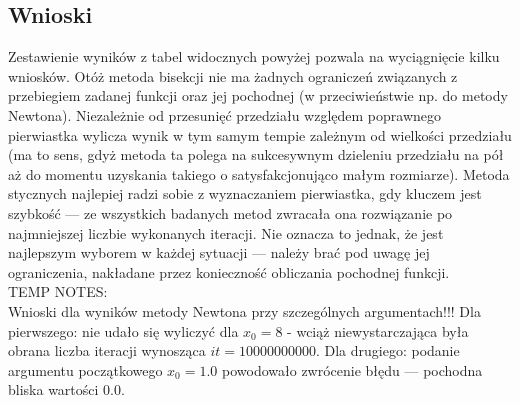 \documentclass{classrep}
\begin{document}
	\subsection{Wnioski}
		Zestawienie wyników z tabel widocznych powyżej pozwala na wyciągnięcie kilku wniosków. Otóż metoda bisekcji nie ma żadnych ograniczeń związanych z przebiegiem zadanej funkcji oraz jej pochodnej (w przeciwieństwie np. do metody Newtona). Niezależnie od przesunięć przedziału względem poprawnego pierwiastka wylicza wynik w tym samym tempie zależnym od wielkości przedziału (ma to sens, gdyż metoda ta polega na sukcesywnym dzieleniu przedziału na pół aż do momentu uzyskania takiego o satysfakcjonująco małym rozmiarze). Metoda stycznych najlepiej radzi sobie z wyznaczaniem pierwiastka, gdy kluczem jest szybkość --- ze wszystkich badanych metod zwracała ona rozwiązanie po najmniejszej liczbie wykonanych iteracji. Nie oznacza to jednak, że jest najlepszym wyborem w każdej sytuacji --- należy brać pod uwagę jej ograniczenia, nakładane przez konieczność obliczania pochodnej funkcji.  \\
	
		TEMP NOTES:	 \\
		Wnioski dla wyników metody Newtona przy szczególnych argumentach!!!		
		Dla pierwszego: nie udało się wyliczyć dla $x_0=8$ - wciąż niewystarczająca była obrana liczba iteracji wynosząca $it=10000000000$.
		Dla drugiego: podanie argumentu początkowego $x_0=1.0$ powodowało zwrócenie błędu --- pochodna bliska wartości $0.0$.
		
\end{document}
